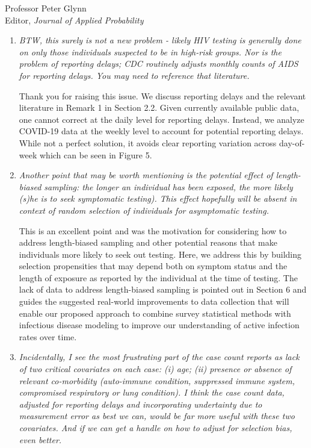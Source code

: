 \documentclass[11pt]{letter} %
\begin{document}
\begin{letter}{Professor
	Peter Glynn\\
	Editor, {\em Journal of Applied Probability}}
\begin{enumerate}
\item {\it BTW, this surely is not a new problem - likely HIV testing is
generally done on only those individuals suspected to be in
high-risk groups.  Nor is the problem of reporting delays;
CDC routinely adjusts monthly counts of AIDS for reporting delays.
You may need to reference that literature.}

\vspace{5mm}
Thank you for raising this issue.  We discuss reporting delays and the relevant literature in Remark 1 in Section 2.2.  Given currently available public data, one cannot correct at the daily level for reporting delays.  Instead, we analyze COVID-19 data at the weekly level to account for potential reporting delays.  While not a perfect solution, it avoids clear reporting variation across day-of-week which can be seen in Figure 5.
\vspace{5mm}

\item {\it Another point that may be worth mentioning is the potential
effect of length-biased sampling: the longer an individual
has been exposed, the more likely (s)he is to seek symptomatic
testing).  This effect hopefully will be absent in context of
random selection of individuals for asymptomatic testing.}

\vspace{5mm}
This is an excellent point and was the motivation for considering how to address length-biased sampling and other potential reasons that make individuals more likely to seek out testing.  Here, we address this by building selection propensities that may depend both on symptom status and the length of exposure as reported by the individual at the time of testing.   The lack of data to address length-biased sampling is pointed out in Section 6 and guides the suggested real-world improvements to data collection that will enable our proposed approach to combine survey statistical methods with infectious disease modeling to improve our understanding of active infection rates over time.
\vspace{5mm}

\item {\it Incidentally, I see the most frustrating part of the case count
reports as lack of two critical covariates on each case: (i) age;
(ii) presence or absence of relevant co-morbidity (auto-immune
condition, suppressed immune system, compromised respiratory or
lung condition).  I think the case count data, adjusted for
reporting delays and incorporating undertainty due to measurement
error as best we can, would be far more useful with these two
covariates.  And if we can get a handle on how to adjust for
selection bias, even better.}


\end{enumerate}
\end{letter}
\end{document}

